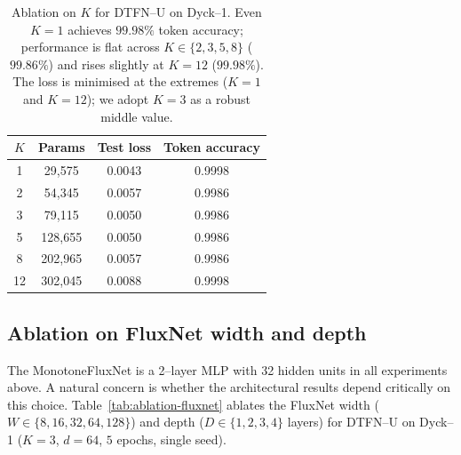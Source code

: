 \documentclass[10pt]{article}
\theoremstyle{definition}
\theoremstyle{remark}
\begin{document}
\begin{table}[h]
  \centering
  \caption{Ablation on $K$ for DTFN--U on Dyck--1.  Even $K=1$
    achieves $99.98\%$ token accuracy; performance is flat across
    $K\in\{2,3,5,8\}$ ($99.86\%$) and rises slightly at $K=12$
    ($99.98\%$).  The loss is minimised at the extremes ($K=1$ and
    $K=12$); we adopt $K=3$ as a robust middle value.}
  \label{tab:ablation-K}
  \begin{tabular}{cccc}
    \toprule
    $K$ & Params & Test loss & Token accuracy \\
    \midrule
    1  & 29{,}575  & 0.0043 & 0.9998 \\
    2  & 54{,}345  & 0.0057 & 0.9986 \\
    3  & 79{,}115  & 0.0050 & 0.9986 \\
    5  & 128{,}655 & 0.0050 & 0.9986 \\
    8  & 202{,}965 & 0.0057 & 0.9986 \\
    12 & 302{,}045 & 0.0088 & 0.9998 \\
    \bottomrule
  \end{tabular}
\end{table}

\subsection{Ablation on FluxNet width and depth}
\label{sec:exp-ablation-fluxnet}

The MonotoneFluxNet is a 2--layer MLP with 32 hidden units in all
experiments above.  A natural concern is whether the architectural
results depend critically on this choice.  Table~\ref{tab:ablation-fluxnet}
ablates the FluxNet width ($W \in \{8, 16, 32, 64, 128\}$) and depth
($D \in \{1, 2, 3, 4\}$ layers) for DTFN--U on Dyck--1 ($K=3$, $d=64$,
$5$ epochs, single seed).
\end{document}
